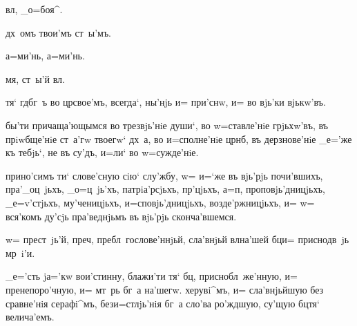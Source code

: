  вл, _о=боя^.


 дх~омъ твои'мъ ст~ы'мъ.

  а=ми'нь, а=ми'нь.


 мя, ст~ы'й вл.

    тя` гд бг~ъ во 
цр свое'мъ, всегда`, ны'нjь и= при'снw, и= во 
вjь'ки вjькw'въ.

    


 бы'ти причаща'ющымся во трезвjь'нiе души`, во 
w=ставле'нiе грjьхw'въ, въ прiwбще'нiе ст~а'гw твоегw` 
дх~а, во и=сполне'нiе цр нб, въ дерзнове'нiе 
_е='же къ тебjь`, не въ су'дъ, и=ли` во w=сужде'нiе.

 прино'симъ ти` слове'сную сiю` слу'жбу, w= 
и=`же въ вjь'рjь почи'вшихъ, пра'_оц~jьхъ, _о=ц~jь'хъ, 
патрiа'рсjьхъ, пр'цjьхъ, а=п, 
проповjь'дницjьхъ, _е=v'стjьхъ, му'ченицjьхъ, 
и=сповjь'дницjьхъ, возде'ржницjьхъ, и= w= вся'комъ ду'сjь 
пра'веднjьмъ въ вjь'рjь сконча'вшемся.


 w= прест~jь'й, преч, 
пребл~гослове'ннjьй, сла'внjьй вл на'шей бц и= 
приснодв~jь мр~i'и.



 _е='сть jа='кw вои'стинну, блажи'ти тя` 
бц, приснобл~же'нную, и= пренепоро'чную, и= мт~рь бг~а 
на'шегw.  херувi^мъ, и= сла'внjьйшую без\ъ 
сравне'нiя серафi^мъ, без\ъ и=стлjь'нiя бг~а сло'ва 
ро'ждшую, су'щую бц тя` велича'емъ.


